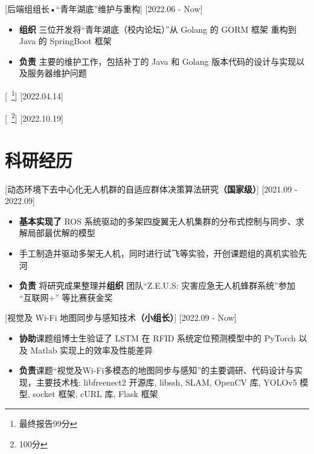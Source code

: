 \documentclass{resume}
\begin{document}
    [后端组组长•“青年湖底”维护与重构]
    [2022.06 - Now] 

    \begin{itemize}
        \item \textbf{组织} 三位开发将“青年湖底（校内论坛）”从 Golang 的 GORM 框架 重构到 Java 的  SpringBoot 框架
        \item \textbf{负责} 主要的维护工作，包括补丁的 Java 和 Golang 版本代码的设计与实现以及服务器维护问题
    \end{itemize}

    [\ \footnote{最终报告99分}]
    [2022.04.14]

    [\ \footnote{100分}]
    [2022.10.19]

    \section{科研经历}

    [动态环境下去中心化无人机群的自适应群体决策算法研究\textbf{（国家级）}]
    [2021.09 - 2022.09]
    \begin{itemize}
        \item \textbf{基本实现了} ROS 系统驱动的多架四旋翼无人机集群的分布式控制与同步、求解局部最优解的模型
        \item 手工制造并驱动多架无人机，同时进行试飞等实验，开创课题组的真机实验先河
        \item \textbf{负责} 将研究成果整理并\textbf{组织} 团队“Z.E.U.S: 灾害应急无人机蜂群系统”参加 “互联网+” 等比赛获金奖
    \end{itemize}

    [视觉及 Wi-Fi 地图同步与感知技术\textbf{（小组长）}]
    [2022.09 - Now]
    \begin{itemize}
        \item \textbf{协助}课题组博士生验证了 LSTM 在 RFID 系统定位预测模型中的 PyTorch 以及 Matlab 实现上的效率及性能差异  
        \item \textbf{负责}课题“视觉及Wi-Fi多模态的地图同步与感知”的主要调研、代码设计与实现，主要技术栈: libfreenect2 开源库, libssh, SLAM, OpenCV 库, YOLOv5 模型, socket 框架, cURL 库, Flask 框架
    \end{itemize}
\end{document}
